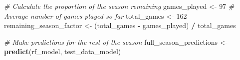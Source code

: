 \documentclass[
]{article}
\newenvironment{Shaded}{\begin{snugshade}}{\end{snugshade}}
\newcommand{\AttributeTok}[1]{\textcolor[rgb]{0.13,0.29,0.53}{#1}}
\newcommand{\CommentTok}[1]{\textcolor[rgb]{0.56,0.35,0.01}{\textit{#1}}}
\newcommand{\ConstantTok}[1]{\textcolor[rgb]{0.56,0.35,0.01}{#1}}
\newcommand{\DecValTok}[1]{\textcolor[rgb]{0.00,0.00,0.81}{#1}}
\newcommand{\FunctionTok}[1]{\textcolor[rgb]{0.13,0.29,0.53}{\textbf{#1}}}
\newcommand{\NormalTok}[1]{#1}
\newcommand{\OtherTok}[1]{\textcolor[rgb]{0.56,0.35,0.01}{#1}}
\newcommand{\SpecialCharTok}[1]{\textcolor[rgb]{0.81,0.36,0.00}{\textbf{#1}}}
\newcommand{\StringTok}[1]{\textcolor[rgb]{0.31,0.60,0.02}{#1}}
\begin{document}
\begin{Shaded}
\begin{Highlighting}[]
\CommentTok{\# Calculate the proportion of the season remaining}
\NormalTok{games\_played }\OtherTok{\textless{}{-}} \DecValTok{97}  \CommentTok{\# Average number of games played so far}
\NormalTok{total\_games }\OtherTok{\textless{}{-}} \DecValTok{162}
\NormalTok{remaining\_season\_factor }\OtherTok{\textless{}{-}}\NormalTok{ (total\_games }\SpecialCharTok{{-}}\NormalTok{ games\_played) }\SpecialCharTok{/}\NormalTok{ total\_games}
\end{Highlighting}
\end{Shaded}

\begin{Shaded}
\end{Shaded}

\begin{Shaded}
\begin{Highlighting}[]
\CommentTok{\# Make predictions for the rest of the season}
\NormalTok{full\_season\_predictions }\OtherTok{\textless{}{-}} \FunctionTok{predict}\NormalTok{(rf\_model, test\_data\_model)}
\end{Highlighting}
\end{Shaded}
\end{document}
